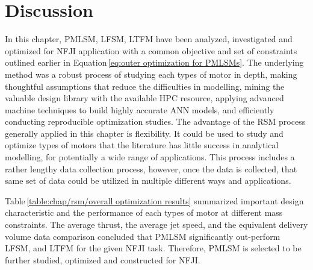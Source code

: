     \section{Discussion}                            \label{Chapter:RSM/discussion}
    
    
        In this chapter, \acf{PMLSM}, \acf{LFSM}, \acf{LTFM} have been analyzed, investigated and optimized for \acf{NFJI} application with a common objective and set of constraints outlined earlier in Equation\,\ref{eq:outer optimization for PMLSMs}. The underlying method was a robust process of studying each types of motor in depth, making thoughtful assumptions that reduce the difficulties in modelling, mining the valuable design library with the available \acf{HPC} resource, applying advanced machine techniques to build highly accurate \acf{ANN} models, and efficiently conducting reproducible optimization studies. The advantage of the \acf{RSM} process generally applied in this chapter is flexibility. It could be used to study and optimize types of motors that the literature has little success in analytical modelling, for potentially a wide range of applications. This process includes a rather lengthy data collection process, however, once the data is collected, that same set of data could be utilized in multiple different ways and applications.
        
        
        Table\,\ref{table:chap/rsm/overall optimization results} summarized important design characteristic and the performance of each types of motor at different mass constraints. The average thrust, the average jet speed, and the equivalent delivery volume data comparison concluded that \acs{PMLSM} significantly out-perform \acs{LFSM}, and \acs{LTFM} for the given \acs{NFJI} task. Therefore, \acs{PMLSM} is selected to be further studied, optimized and constructed for \acs{NFJI}.
        
